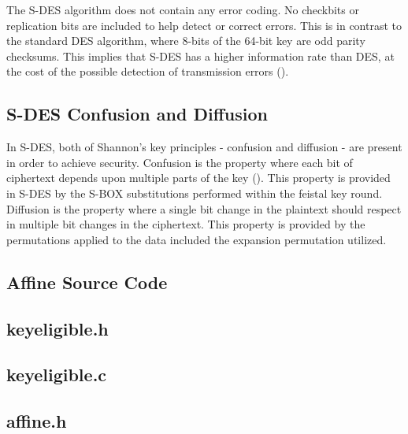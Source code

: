 \documentclass[]{article}
\begin{document}
The S-DES algorithm does not contain any error coding. No checkbits or replication bits are included to help detect or correct errors. This is in contrast to the standard DES algorithm, where 8-bits of the 64-bit key are odd parity checksums. This implies that S-DES has a higher information rate than DES, at the cost of the possible detection of transmission errors (\cite{alttext}).

\subsection*{S-DES Confusion and Diffusion}

In S-DES, both of Shannon's key principles - confusion and diffusion - are present in order to achieve security. Confusion is the property where each bit of ciphertext depends upon multiple parts of the key (\cite{maintext}). This property is provided in S-DES by the S-BOX substitutions performed within the feistal key round.\\

 Diffusion is the property where a single bit change in the plaintext should respect in multiple bit changes in the ciphertext. This property is provided by the permutations applied to the data included the expansion permutation utilized.

\pagebreak


\vspace*{-0.8cm}
\begin{center}
	\section*{Affine Source Code}
\end{center}

\subsection*{keyeligible.h}
\pagebreak{}
\subsection*{keyeligible.c}
\pagebreak{}
\subsection*{affine.h}
\pagebreak{}
\end{document}
